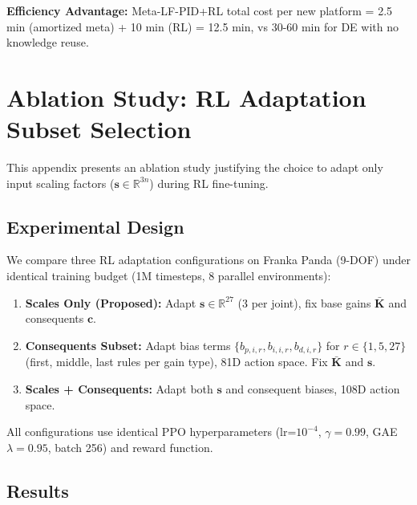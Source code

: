 \documentclass[a4paper]{cas-sc}
\begin{document}
\textbf{Efficiency Advantage:} Meta-LF-PID+RL total cost per new platform = 2.5 min (amortized meta) + 10 min (RL) = 12.5 min, vs 30-60 min for DE with no knowledge reuse.

\newpage
\section{Ablation Study: RL Adaptation Subset Selection}
\label{app:ablation_rl}

This appendix presents an ablation study justifying the choice to adapt only input scaling factors ($\bm{s} \in \mathbb{R}^{3n}$) during RL fine-tuning.

\subsection{Experimental Design}

We compare three RL adaptation configurations on Franka Panda (9-DOF) under identical training budget (1M timesteps, 8 parallel environments):

\begin{enumerate}[leftmargin=*, itemsep=2pt]
    \item \textbf{Scales Only (Proposed):} Adapt $\bm{s} \in \mathbb{R}^{27}$ (3 per joint), fix base gains $\bar{\bm{K}}$ and consequents $\bm{c}$.
    \item \textbf{Consequents Subset:} Adapt bias terms $\{b_{p,i,r}, b_{i,i,r}, b_{d,i,r}\}$ for $r \in \{1,5,27\}$ (first, middle, last rules per gain type), 81D action space. Fix $\bar{\bm{K}}$ and $\bm{s}$.
    \item \textbf{Scales + Consequents:} Adapt both $\bm{s}$ and consequent biases, 108D action space.
\end{enumerate}

All configurations use identical PPO hyperparameters (lr=$10^{-4}$, $\gamma=0.99$, GAE $\lambda=0.95$, batch 256) and reward function.

\subsection{Results}
\end{document}

